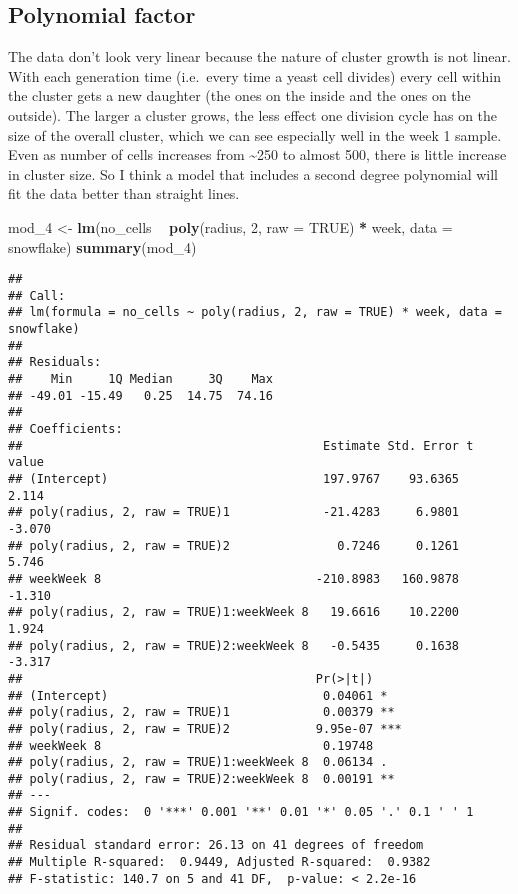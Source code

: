 \documentclass[]{article}
\newenvironment{Shaded}{\begin{snugshade}}{\end{snugshade}}
\newcommand{\KeywordTok}[1]{\textcolor[rgb]{0.13,0.29,0.53}{\textbf{#1}}}
\newcommand{\DataTypeTok}[1]{\textcolor[rgb]{0.13,0.29,0.53}{#1}}
\newcommand{\DecValTok}[1]{\textcolor[rgb]{0.00,0.00,0.81}{#1}}
\newcommand{\StringTok}[1]{\textcolor[rgb]{0.31,0.60,0.02}{#1}}
\newcommand{\OtherTok}[1]{\textcolor[rgb]{0.56,0.35,0.01}{#1}}
\newcommand{\OperatorTok}[1]{\textcolor[rgb]{0.81,0.36,0.00}{\textbf{#1}}}
\newcommand{\NormalTok}[1]{#1}
\begin{document}
\subsection{Polynomial factor}\label{polynomial-factor}

The data don't look very linear because the nature of cluster growth is
not linear. With each generation time (i.e.~every time a yeast cell
divides) every cell within the cluster gets a new daughter (the ones on
the inside and the ones on the outside). The larger a cluster grows, the
less effect one division cycle has on the size of the overall cluster,
which we can see especially well in the week 1 sample. Even as number of
cells increases from \textasciitilde{}250 to almost 500, there is little
increase in cluster size. So I think a model that includes a second
degree polynomial will fit the data better than straight lines.

\begin{Shaded}
\begin{Highlighting}[]
\NormalTok{mod_}\DecValTok{4}\NormalTok{ <-}\StringTok{ }\KeywordTok{lm}\NormalTok{(no_cells }\OperatorTok{~}\StringTok{ }\KeywordTok{poly}\NormalTok{(radius, }\DecValTok{2}\NormalTok{, }\DataTypeTok{raw =} \OtherTok{TRUE}\NormalTok{) }\OperatorTok{*}\StringTok{ }\NormalTok{week, }\DataTypeTok{data =}\NormalTok{ snowflake)}
\KeywordTok{summary}\NormalTok{(mod_}\DecValTok{4}\NormalTok{)}
\end{Highlighting}
\end{Shaded}

\begin{verbatim}
## 
## Call:
## lm(formula = no_cells ~ poly(radius, 2, raw = TRUE) * week, data = snowflake)
## 
## Residuals:
##    Min     1Q Median     3Q    Max 
## -49.01 -15.49   0.25  14.75  74.16 
## 
## Coefficients:
##                                          Estimate Std. Error t value
## (Intercept)                              197.9767    93.6365   2.114
## poly(radius, 2, raw = TRUE)1             -21.4283     6.9801  -3.070
## poly(radius, 2, raw = TRUE)2               0.7246     0.1261   5.746
## weekWeek 8                              -210.8983   160.9878  -1.310
## poly(radius, 2, raw = TRUE)1:weekWeek 8   19.6616    10.2200   1.924
## poly(radius, 2, raw = TRUE)2:weekWeek 8   -0.5435     0.1638  -3.317
##                                         Pr(>|t|)    
## (Intercept)                              0.04061 *  
## poly(radius, 2, raw = TRUE)1             0.00379 ** 
## poly(radius, 2, raw = TRUE)2            9.95e-07 ***
## weekWeek 8                               0.19748    
## poly(radius, 2, raw = TRUE)1:weekWeek 8  0.06134 .  
## poly(radius, 2, raw = TRUE)2:weekWeek 8  0.00191 ** 
## ---
## Signif. codes:  0 '***' 0.001 '**' 0.01 '*' 0.05 '.' 0.1 ' ' 1
## 
## Residual standard error: 26.13 on 41 degrees of freedom
## Multiple R-squared:  0.9449, Adjusted R-squared:  0.9382 
## F-statistic: 140.7 on 5 and 41 DF,  p-value: < 2.2e-16
\end{verbatim}
\end{document}
